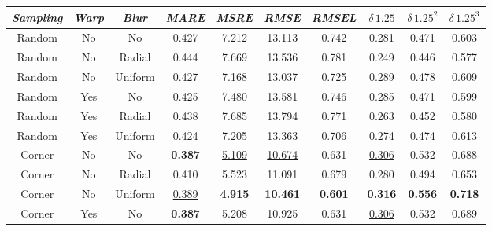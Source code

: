 \begin{table}
    \begin{adjustwidth}{-.2cm}{-.2cm}
        \centering
    \begin{tabular}{c|c|c|c|c|c|c|c|c|c}
        \emph{Sampling} & \emph{Warp} & \emph{Blur} & \emph{MARE} & \emph{MSRE} & \emph{RMSE} & \emph{RMSEL} & \emph{$\delta \, 1.25$} & \emph{$\delta \, 1.25^{2}$} & \emph{$\delta \, 1.25^{3}$} \\
        \hline
        Random & No  & No      &            0.427  &            7.212  &            13.113  &            0.742  &            0.281  &            0.471  &            0.603  \\
        Random & No  & Radial  &            0.444  &            7.669  &            13.536  &            0.781  &            0.249  &            0.446  &            0.577  \\
        Random & No  & Uniform &            0.427  &            7.168  &            13.037  &            0.725  &            0.289  &            0.478  &            0.609  \\
        Random & Yes & No      &            0.425  &            7.480  &            13.581  &            0.746  &            0.285  &            0.471  &            0.599  \\
        Random & Yes & Radial  &            0.438  &            7.685  &            13.794  &            0.771  &            0.263  &            0.452  &            0.580  \\
        Random & Yes & Uniform &            0.424  &            7.205  &            13.363  &            0.706  &            0.274  &            0.474  &            0.613  \\
        Corner & No  & No      &    \textbf{0.387} & \underline{5.109} & \underline{10.674} &            0.631  & \underline{0.306} &            0.532  &            0.688  \\
        Corner & No  & Radial  &            0.410  &            5.523  &            11.091  &            0.679  &            0.280  &            0.494  &            0.653  \\
        Corner & No  & Uniform & \underline{0.389} &    \textbf{4.915} &    \textbf{10.461} &    \textbf{0.601} &    \textbf{0.316} &    \textbf{0.556} &    \textbf{0.718} \\
        Corner & Yes & No      &    \textbf{0.387} &            5.208  &            10.925  &            0.631  & \underline{0.306} &            0.532  &            0.689  \\

\end{tabular}
\end{adjustwidth}
\end{table}
